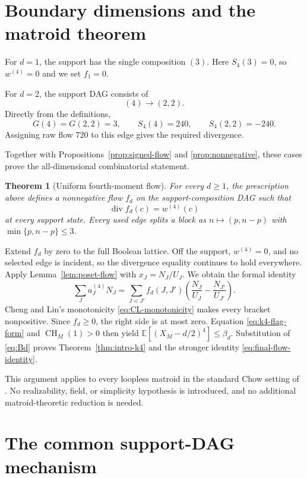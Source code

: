 \documentclass[11pt]{amsart}
\newtheorem{theorem}{Theorem}[section]
\theoremstyle{definition}
\theoremstyle{remark}
\newcommand{\CH}{\operatorname{CH}}
\newcommand{\divg}{\operatorname{div}}
\newcommand{\E}{\mathbb E}
\begin{document}
\section{Boundary dimensions and the matroid theorem}
\label{sec:small-d}

For $d=1$, the support has the single composition $(3)$.  Here
$S_4(3)=0$, so $w^{(4)}=0$ and we set $f_1=0$.

For $d=2$, the support DAG consists of
\[
 (4)\longrightarrow(2,2).
\]
Directly from the definitions,
\[
 G(4)=G(2,2)=3,\qquad S_4(4)=240,\qquad S_4(2,2)=-240.
\]
Assigning raw flow $720$ to this edge gives the required divergence.

Together with Propositions~\ref{prop:signed-flow} and
\ref{prop:nonnegative}, these cases prove the all-dimensional combinatorial
statement.

\begin{theorem}[Uniform fourth-moment flow]
\label{thm:uniform-flow}
For every $d\ge1$, the prescription above defines a nonnegative flow
$f_d$ on the support-composition DAG such that
\[
 \divg f_d(c)=w^{(4)}(c)
\]
at every support state.  Every used edge splits a block as
$n\mapsto(p,n-p)$ with $\min\{p,n-p\}\le3$.
\end{theorem}

Extend $f_d$ by zero to the full Boolean lattice.  Off the support,
$w^{(4)}=0$, and no selected edge is incident, so the divergence equality
continues to hold everywhere.  Apply Lemma~\ref{lem:poset-flow} with
$x_J=N_J/U_J$.  We obtain the formal identity
\begin{equation}
 \sum_Ja_J^{(4)}N_J
 =\sum_{J\lessdot J'}f_d(J,J')
 \left(\frac{N_J}{U_J}-\frac{N_{J'}}{U_{J'}}\right).
 \label{eq:final-flow-identity}
\end{equation}
Cheng and Lin's monotonicity \eqref{eq:CL-monotonicity} makes every bracket
nonpositive.  Since $f_d\ge0$, the right side is at most zero.  Equation
\eqref{eq:k4-flag-form} and $\CH_M(1)>0$ then yield
$\E[(X_M-d/2)^4]\le\beta_d$.  Substitution of \eqref{eq:Bd} proves
Theorem~\ref{thm:intro-k4} and the stronger identity
\eqref{eq:final-flow-identity}.

This argument applies to every loopless matroid in the standard Chow
setting of \cite{ChengLin}.  No realizability, field, or simplicity
hypothesis is introduced, and no additional matroid-theoretic reduction is
needed.

\section{The common support-DAG mechanism}
\label{sec:common-mechanism}
\end{document}
